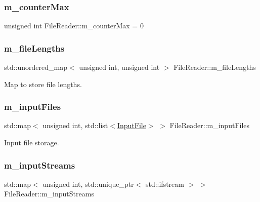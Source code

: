 \subsubsection{\texorpdfstring{m\+\_\+counter\+Max}{m\_counterMax}}
{\footnotesize\ttfamily unsigned int File\+Reader\+::m\+\_\+counter\+Max = 0\hspace{0.3cm}{\ttfamily [private]}}

\mbox{\label{class_file_reader_a2d560dd766f6866a1c11cc44e059c246}} 
\subsubsection{\texorpdfstring{m\+\_\+file\+Lengths}{m\_fileLengths}}
{\footnotesize\ttfamily std\+::unordered\+\_\+map$<$ unsigned int, unsigned int $>$ File\+Reader\+::m\+\_\+file\+Lengths\hspace{0.3cm}{\ttfamily [private]}}



Map to store file lengths. 

\mbox{\label{class_file_reader_a8b144dccc96fcc95e43a96a300341855}} 
\subsubsection{\texorpdfstring{m\+\_\+input\+Files}{m\_inputFiles}}
{\footnotesize\ttfamily std\+::map$<$ unsigned int, std\+::list$<$\hyperlink{class_input_file}{Input\+File}$>$ $>$ File\+Reader\+::m\+\_\+input\+Files\hspace{0.3cm}{\ttfamily [private]}}



Input file storage. 

\mbox{\label{class_file_reader_af7ac8567ed5b1fa022a8f98099e23f43}} 
\subsubsection{\texorpdfstring{m\+\_\+input\+Streams}{m\_inputStreams}}
{\footnotesize\ttfamily std\+::map$<$ unsigned int, std\+::unique\+\_\+ptr$<$ std\+::ifstream $>$ $>$ File\+Reader\+::m\+\_\+input\+Streams\hspace{0.3cm}{\ttfamily [private]}}




